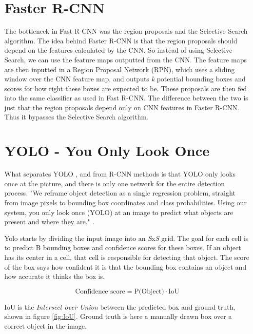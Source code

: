 \section{Faster R-CNN }
The bottleneck in Fast R-CNN was the region proposals and the Selective Search algorithm. The idea behind Faster R-CNN \citep{FasterR-CNN} is that the region proposals should depend on the features calculated by the CNN. So instead of using Selective Search, we can use the feature maps outputted from the CNN. The feature maps are then inputted in a Region Proposal Network (RPN), which uses a sliding window over the CNN feature map, and outputs \textit{k} potential bounding boxes and scores for how right these boxes are expected to be. These proposals are then fed into the same classifier as used in Fast R-CNN. The difference between the two is just that the region proposals depend only on CNN features in Faster R-CNN. Thus it bypasses the Selective Search algorithm.



\section{YOLO - You Only Look Once }
\label{sec:yolo}
What separates YOLO \citep{YOLOv1}, \citep{YOLOv2} and \citep{YOLOv3} from R-CNN methods is that YOLO only looks once at the picture, and there is only one network for the entire detection process. "We reframe object detection as a single regression problem, straight from image pixels to bounding box coordinates and class probabilities. Using our system, you only look once (YOLO) at an image to predict what objects are present and where they are." \citep{YOLOv1}. 
\vspace{0.5cm}

Yolo starts by dividing the input image into an \textit{S}x\textit{S} grid. The goal for each cell is to predict B bounding boxes and confidence scores for these boxes. If an object has its center in a cell, that cell is responsible for detecting that object. The score of the box says how confident it is that the bounding box contains an object and how accurate it thinks the box is. 

\begin{equation}
    \text{Confidence score} = \text{P(Object)} \cdot \text{IoU}
\end{equation}

IoU is the \textit{Intersect over Union} between the predicted box and ground truth, shown in figure \ref{fig:IoU}. Ground truth is here a manually drawn box over a correct object in the image.



